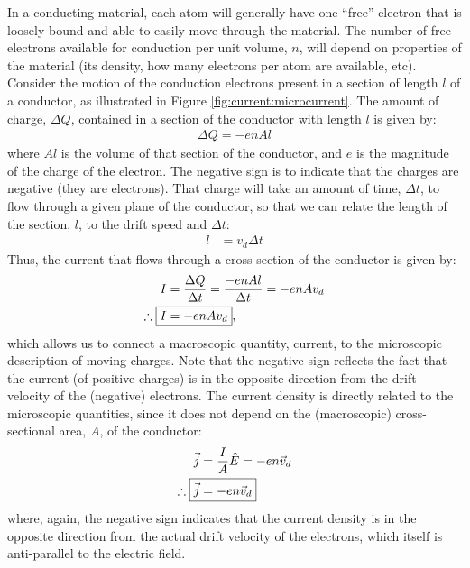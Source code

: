 In a conducting material, each atom will generally have one ``free'' electron that is loosely bound and able to easily move through the material. The number of free electrons available for conduction per unit volume, $n$, will depend on properties of the material (its density, how many electrons per atom are available, etc). Consider the motion of the conduction electrons present in a section of length $l$ of a conductor, as illustrated in Figure \ref{fig:current:microcurrent}. The amount of charge, $\Delta Q$, contained in a section of the conductor with length $l$ is given by:
\begin{align*}
\Delta Q= -e n Al
\end{align*}
where $Al$ is the volume of that section of the conductor, and $e$ is the magnitude of the charge of the electron. The negative sign is to indicate that the charges are negative (they are electrons). That charge will take an amount of time, $\Delta t$, to flow through a given plane of the conductor, so that we can relate the length of the section, $l$, to the drift speed and $\Delta t$:
\begin{align*}
l&=v_d\Delta t
\end{align*}
Thus, the current that flows through a cross-section of the conductor is given by:
\begin{align*}
I&=\frac{\Delta Q}{\Delta t}=\frac{-e n Al}{\Delta t}=-enAv_d\\
\therefore\;\Aboxed{I&=-enAv_d},
\end{align*}
which allows us to connect a macroscopic quantity, current, to the microscopic description of moving charges. Note that the negative sign reflects the fact that the current (of positive charges) is in the opposite direction from the drift velocity of the (negative) electrons. The current density is directly related to the microscopic quantities, since it does not depend on the (macroscopic) cross-sectional area, $A$, of the conductor:
\begin{align*}
\vec j&=\frac{I}{A}\hat E = -en\vec v_d\\
\therefore\; \Aboxed{\vec j &= -en\vec v_d}
\end{align*}
where, again, the negative sign indicates that the current density is in the opposite direction from the actual drift velocity of the electrons, which itself is anti-parallel to the electric field.


